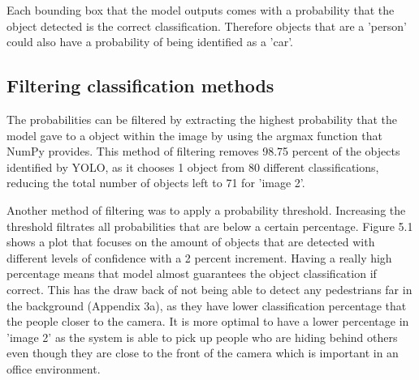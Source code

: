 \documentclass[12pt]{report}
\begin{document}
\vspace{2mm}

Each bounding box that the model outputs comes with a probability that the object detected is the correct classification. Therefore objects that are a 'person' could also have a probability of being identified as a 'car'.

\subsection{Filtering classification methods}

The probabilities can be filtered by extracting the highest probability that the model gave to a object within the image by using the argmax function that NumPy provides. This method of filtering removes 98.75 percent of the objects identified by YOLO, as it chooses 1 object from 80 different classifications, reducing the total number of objects left to 71 for 'image 2'.

\vspace{2mm}

Another method of filtering was to apply a probability threshold. Increasing the threshold filtrates all probabilities that are below a certain percentage. Figure 5.1 shows a plot that focuses on the amount of objects that are detected with different levels of confidence with a 2 percent increment. Having a really high percentage means that model almost guarantees the object classification if correct. This has the draw back of not being able to detect any pedestrians far in the background (Appendix 3a), as they have lower classification percentage that the people closer to the camera. It is more optimal to have a lower percentage in 'image 2' as the system is able to pick up people who are hiding behind others even though they are close to the front of the camera which is important in an office environment.
\end{document}

